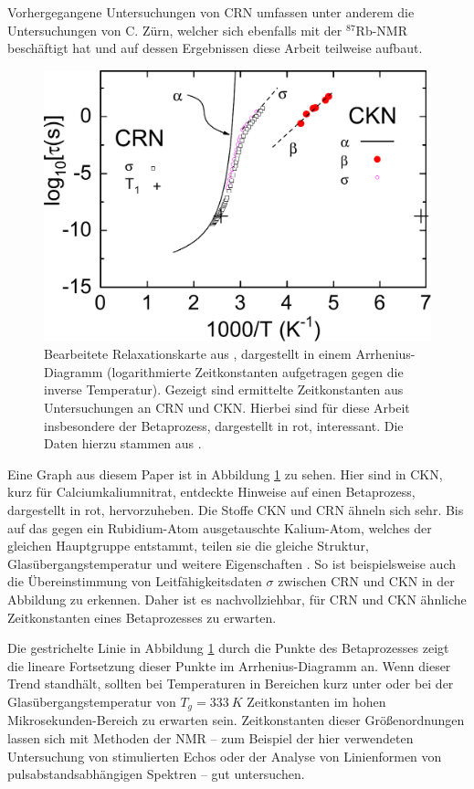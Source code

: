 Vorhergegangene Untersuchungen von CRN umfassen unter anderem die Untersuchungen von C. Zürn, welcher sich ebenfalls mit der $^\text{87}$Rb-NMR beschäftigt hat \cite{zuern_paper} und auf dessen Ergebnissen diese Arbeit teilweise aufbaut.
\begin{figure}
	\begin{center}
		\includegraphics[width=.7\textwidth]{graphics/zuern/Plot1_b2.pdf}
	\end{center}
	\caption{Bearbeitete Relaxationskarte aus \cite{zuern_paper}, dargestellt in einem Arrhenius-Diagramm (logarithmierte Zeitkonstanten aufgetragen gegen die inverse Temperatur). Gezeigt sind ermittelte Zeitkonstanten aus Untersuchungen an CRN und CKN. Hierbei sind für diese Arbeit insbesondere der Betaprozess, dargestellt in rot, interessant. Die Daten hierzu stammen aus \cite{johari_beta}.} \label{fig:einl:zuernpaper}
\end{figure}

Eine Graph aus diesem Paper ist in Abbildung \ref{fig:einl:zuernpaper} zu sehen. Hier sind in CKN, kurz für Calciumkaliumnitrat, entdeckte Hinweise auf einen Betaprozess, dargestellt in rot, hervorzuheben. Die Stoffe CKN und CRN ähneln sich sehr. Bis auf das gegen ein Rubidium-Atom ausgetauschte Kalium-Atom, welches der gleichen Hauptgruppe entstammt, teilen sie die gleiche Struktur, Glasübergangstemperatur und weitere Eigenschaften \cite{PIMENOV199793}. So ist beispielsweise auch die Übereinstimmung von Leitfähigkeitsdaten $\sigma$ zwischen CRN und CKN in der Abbildung zu erkennen. Daher ist es nachvollziehbar, für CRN und CKN ähnliche Zeitkonstanten eines Betaprozesses zu erwarten.

Die gestrichelte Linie in Abbildung \ref{fig:einl:zuernpaper} durch die Punkte des Betaprozesses zeigt die lineare Fortsetzung dieser Punkte im Arrhenius-Diagramm an. Wenn dieser Trend standhält, sollten bei Temperaturen in Bereichen kurz unter oder bei der Glasübergangstemperatur von $T_g = \SI{333}{K}$ Zeitkonstanten im hohen Mikrosekunden-Bereich zu erwarten sein. Zeitkonstanten dieser Größenordnungen lassen sich mit Methoden der NMR -- zum Beispiel der hier verwendeten Untersuchung von stimulierten Echos oder der Analyse von Linienformen von pulsabstandsabhängigen Spektren -- gut untersuchen.

